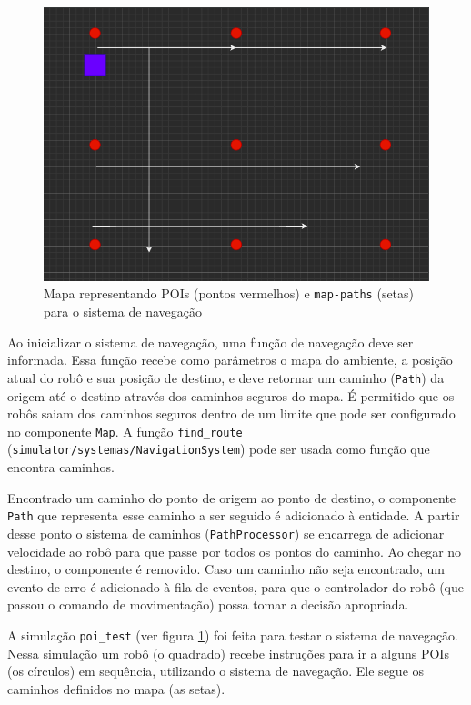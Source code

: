 \begin{figure}[ht]
    \centering
    \includegraphics[width=.8\textwidth]{img/map_poi_test.png}
    \caption{Mapa representando POIs (pontos vermelhos) e \texttt{map-paths} (setas) para o sistema de navegação}
    \label{fig:navigation_map}
\end{figure}

Ao inicializar o sistema de navegação, uma função de navegação deve ser informada. Essa função recebe como parâmetros o mapa do ambiente, a posição atual do robô e sua posição de destino, e deve retornar um caminho (\texttt{Path}) da origem até o destino através dos caminhos seguros do mapa. É permitido que os robôs saiam dos caminhos seguros dentro de um limite que pode ser configurado no componente \texttt{Map}. A função \texttt{find\_route} (\texttt{simulator/systemas/NavigationSystem}) pode ser usada como função que encontra caminhos.

Encontrado um caminho do ponto de origem ao ponto de destino, o componente \texttt{Path} que representa esse caminho a ser seguido é adicionado à entidade. A partir desse ponto o sistema de caminhos (\texttt{PathProcessor}) se encarrega de adicionar velocidade ao robô para que passe por todos os pontos do caminho. Ao chegar no destino, o componente é removido. Caso um caminho não seja encontrado, um evento de erro é adicionado à fila de eventos, para que o controlador do robô (que passou o comando de movimentação) possa tomar a decisão apropriada.

A simulação \texttt{poi\_test} (ver figura \ref{fig:navigation_map}) foi feita para testar o sistema de navegação. Nessa simulação um robô (o quadrado) recebe instruções para ir a alguns POIs (os círculos) em sequência, utilizando o sistema de navegação. Ele segue os caminhos definidos no mapa (as setas). 

